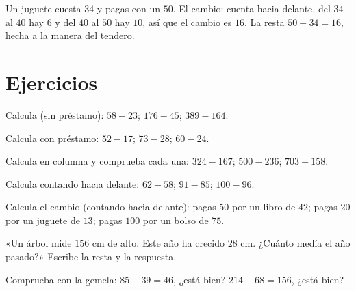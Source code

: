 \begin{example}\label{ex:g2:subtraction:change}
Un juguete cuesta $34$ y pagas con un $50$. El cambio: cuenta hacia delante,
del $34$ al $40$ hay $6$ y del $40$ al $50$ hay $10$, así que el cambio es $16$.
La resta $50 - 34 = 16$, hecha a la manera del tendero.
\end{example}

\section{Ejercicios}

\begin{exercise}[$\star$]\label{exo:g2:subtraction:1}
Calcula (sin préstamo): $58 - 23$; \quad $176 - 45$; \quad
$389 - 164$.
\end{exercise}

\begin{exercise}[$\star$]\label{exo:g2:subtraction:2}
Calcula con préstamo: $52 - 17$; \quad $73 - 28$; \quad
$60 - 24$.
\end{exercise}

\begin{exercise}[$\star$]\label{exo:g2:subtraction:3}
Calcula en columna y comprueba cada una: $324 - 167$; \quad
$500 - 236$; \quad $703 - 158$.
\end{exercise}

\begin{exercise}[$\star$]\label{exo:g2:subtraction:4}
Calcula contando hacia delante: $62 - 58$; \quad $91 - 85$; \quad
$100 - 96$.
\end{exercise}

\begin{exercise}[$\star$]\label{exo:g2:subtraction:5}
Calcula el cambio (contando hacia delante): pagas $50$ por un libro de $42$; pagas
$20$ por un juguete de $13$; pagas $100$ por un bolso de $75$.
\end{exercise}

\begin{exercise}[$\star$]\label{exo:g2:subtraction:6}
«Un árbol mide $156$ cm de alto. Este año ha crecido $28$ cm. ¿Cuánto medía
el año pasado?» Escribe la resta y la respuesta.
\end{exercise}

\begin{exercise}[$\star$]\label{exo:g2:subtraction:7}
Comprueba con la  gemela: $85 - 39 = 46$, ¿está bien?
$214 - 68 = 156$, ¿está bien?
\end{exercise}

